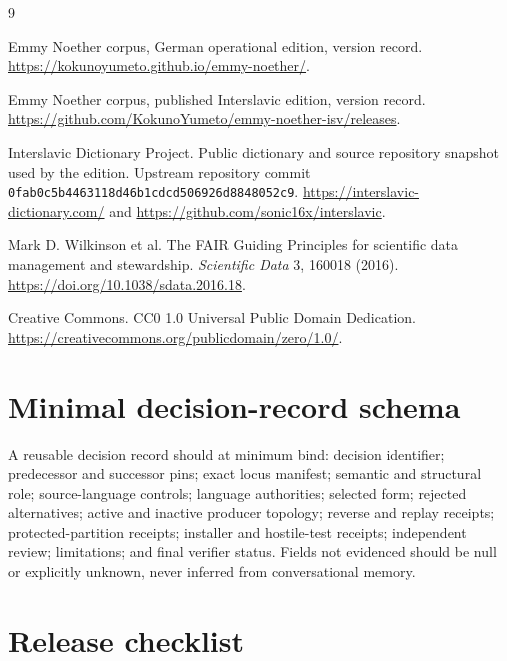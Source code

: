 \documentclass[11pt,a4paper]{article}
\begin{document}
\begin{thebibliography}{9}
\raggedright
\setlength{\itemsep}{0.65em}

Emmy Noether corpus, German operational edition, version record.
\newblock \url{https://kokunoyumeto.github.io/emmy-noether/}.\par

Emmy Noether corpus, published Interslavic edition, version record.
\newblock \url{https://github.com/KokunoYumeto/emmy-noether-isv/releases}.\par

Interslavic Dictionary Project.
\newblock Public dictionary and source repository snapshot used by the edition.
\newblock Upstream repository commit \nolinkurl{0fab0c5b4463118d46b1cdcd506926d8848052c9}.
\newblock \url{https://interslavic-dictionary.com/} and \url{https://github.com/sonic16x/interslavic}.\par

Mark D. Wilkinson et al.
\newblock The FAIR Guiding Principles for scientific data management and stewardship.
\newblock \textit{Scientific Data} 3, 160018 (2016).
\newblock \url{https://doi.org/10.1038/sdata.2016.18}.\par

Creative Commons.
\newblock CC0 1.0 Universal Public Domain Dedication.
\newblock \url{https://creativecommons.org/publicdomain/zero/1.0/}.\par

\end{thebibliography}

\appendix
\section{Minimal decision-record schema}

A reusable decision record should at minimum bind: decision identifier; predecessor and successor pins; exact locus manifest; semantic and structural role; source-language controls; language authorities; selected form; rejected alternatives; active and inactive producer topology; reverse and replay receipts; protected-partition receipts; installer and hostile-test receipts; independent review; limitations; and final verifier status. Fields not evidenced should be null or explicitly unknown, never inferred from conversational memory.

\section{Release checklist}
\end{document}
